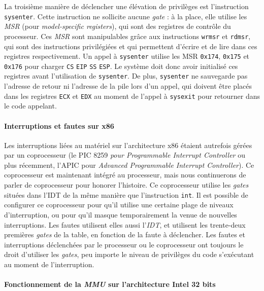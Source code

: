 La troisième manière de déclencher une élévation de privilèges est l'instruction \texttt{sysenter}. Cette 
instruction ne sollicite aucune \emph{gate} : à la place, elle utilise les \emph{MSR} (pour \emph{model-specific registers}), qui sont des registres de contrôle du processeur. Ces \emph{MSR} sont manipulables grâce aux instructions \texttt{wrmsr} et \texttt{rdmsr}, qui sont des instructions privilégiées et qui permettent d'écrire et de lire dans ces registres respectivement. Un appel à \texttt{sysenter} utilise les MSR \texttt{0x174}, \texttt{0x175} et \texttt{0x176} pour charger \texttt{CS} \texttt{EIP} \texttt{SS} \texttt{ESP}. Le système doit donc avoir initialisé ces registres avant l'utilisation de \texttt{sysenter}. De plus, \texttt{sysenter} ne sauvegarde pas l'adresse de retour ni l'adresse de la pile lors d'un appel, qui doivent être placés dans les registres \texttt{ECX} et \texttt{EDX} au moment de l'appel à \texttt{sysexit} pour retourner dans le code appelant.

\paragraph{Interruptions et fautes sur x86}

Les interruptions liées au matériel sur l'architecture x86 étaient autrefois gérées par un coprocesseur (le PIC 8259 \emph{pour Programmable Interrupt Controller} ou plus récemment, l'APIC pour \emph{Advanced Programmable Interrupt Controller}). Ce coprocesseur est maintenant intégré au processeur, mais nous continuerons de parler de coprocesseur pour honorer l'histoire. Ce coprocesseur utilise les \emph{gates} situées dans l'IDT de la même manière que l'instruction \texttt{int}. Il est possible de configurer ce coprocesseur
pour qu'il utilise une certaine plage de niveaux d'interruption, ou pour qu'il masque temporairement la venue de nouvelles interruptions. Les fautes utilisent elles aussi l'\emph{IDT}, et utilisent les trente-deux premières \emph{gates} de la table, en fonction de la faute à déclencher. Les fautes et interruptions déclenchées par le processeur ou le coprocesseur ont toujours le droit d'utiliser les \emph{gates}, peu importe le niveau de privilèges du code s'exécutant au moment de l'interruption.

\paragraph{Fonctionnement de la \emph{MMU} sur l'architecture Intel 32 bits}

